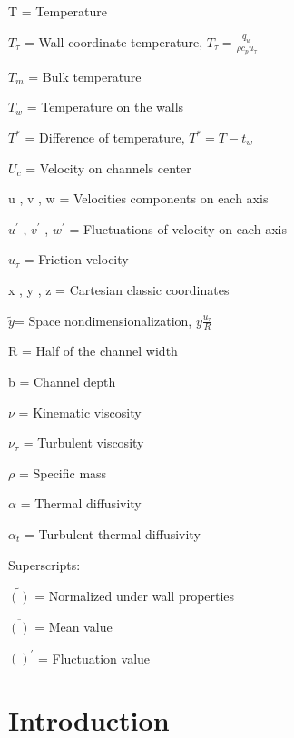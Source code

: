 \documentclass[10pt]{article} %
\begin{document}
	
	
	T = Temperature
	
	
	
	$T_\tau$ = Wall coordinate temperature, $T_\tau = \frac{q_w}{\rho c_p u_\tau}$ 
	
	
	
	
	$T_m$ = Bulk temperature 
	
	
	
	
	$T_w$ = Temperature on the walls
	
	
	
	
	$T^\ast$ = Difference of temperature, $T^\ast = T - t_w $ 
	
	
	
	
	${U}_c$ = Velocity on channels center
	
	
	
	u , v , w = Velocities components on each axis
	
	
	$u^\prime $ , $ v^\prime $ , $ w^\prime $ = Fluctuations of velocity on each axis
	
	
	$u_\tau$ = Friction velocity
	
	
	x , y , z = Cartesian classic coordinates
	
	
	$\tilde{y} $= Space nondimensionalization, $ y \frac{u_\tau}{R} $
	
	
	R = Half of the channel width
	
	
	
	b = Channel depth
	
	
	
	$\nu$ = Kinematic viscosity
	
	
	$\nu_\tau$ = Turbulent viscosity
	
	
	$\rho$ = Specific mass
	
	
	$\alpha$ = Thermal diffusivity
	
	
	$\alpha_t$ = Turbulent thermal diffusivity 
	
	\vspace{8.00mm}
	
	\begin{LARGE}
		Superscripts: 
	\end{LARGE} 
	
	$\tilde{()}$ = Normalized under wall properties
	
	$\overline{()}$ = Mean value
	 
	$()^\prime$ = Fluctuation value


\section{Introduction}
\end{document}
